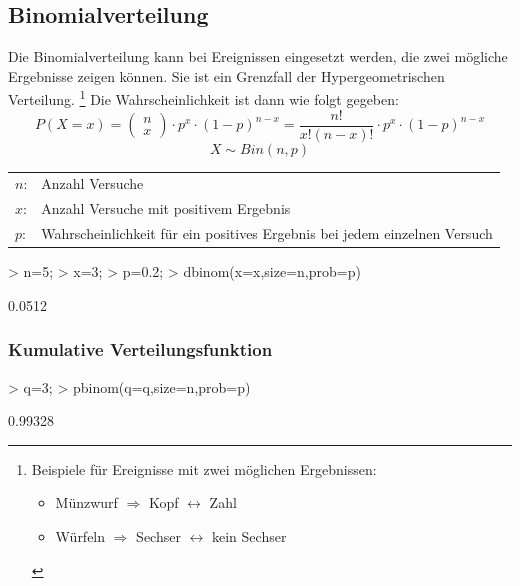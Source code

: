 \subsection{Binomialverteilung}
Die Binomialverteilung kann bei Ereignissen eingesetzt werden, die zwei 
mögliche Ergebnisse zeigen können. Sie ist ein Grenzfall der 
Hypergeometrischen Verteilung. 
\footnote{Beispiele für Ereignisse mit zwei möglichen Ergebnissen: 
  \begin{itemize} 
    \item Münzwurf $\Rightarrow$ Kopf $\leftrightarrow$ Zahl
    \item Würfeln $\Rightarrow$ Sechser $\leftrightarrow$ kein Sechser
  \end{itemize}}
Die Wahrscheinlichkeit ist dann wie folgt gegeben: 
\[ P(X=x) = 
\left( \begin{array}{c}n\\x\end{array} \right) \cdot p^x \cdot (1-p)^{n-x} 
= \frac{n!}{x! (n-x)!} \cdot p^x \cdot (1-p)^{n-x} \]
\[ X \sim Bin(n,p) \]
\begin{tabular}{@{}ll}
  $n$: & Anzahl Versuche \\
  $x$: & Anzahl Versuche mit positivem Ergebnis \\
  $p$: & Wahrscheinlichkeit für ein positives Ergebnis bei jedem einzelnen Versuch
\end{tabular} 
\begin{Schunk}
\begin{Sinput}
> n=5;
> x=3;
> p=0.2;
> dbinom(x=x,size=n,prob=p)
\end{Sinput}
\begin{Soutput}
[1] 0.0512
\end{Soutput}
\end{Schunk}
\subsubsection{Kumulative Verteilungsfunktion}
\begin{Schunk}
\begin{Sinput}
> q=3;
> pbinom(q=q,size=n,prob=p)
\end{Sinput}
\begin{Soutput}
[1] 0.99328
\end{Soutput}
\end{Schunk}

